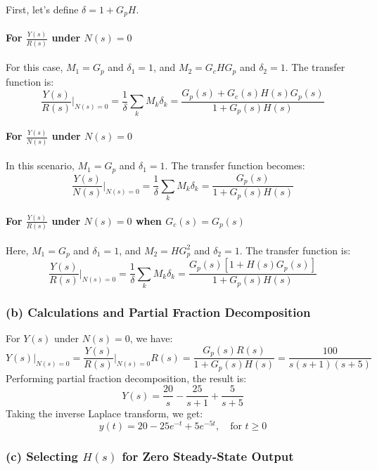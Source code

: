 \documentclass{article}
\begin{document}
First, let's define \( \delta = 1 + G_p H \).

\paragraph{For \( \frac{Y(s)}{R(s)} \) under \( N(s) = 0 \)}
For this case, \( M_1 = G_p \) and \( \delta_1 = 1 \), and \( M_2 = G_c H G_p \) and \( \delta_2 = 1 \).
The transfer function is:
\[
\frac{Y(s)}{R(s)} \bigg|_{N(s) = 0} = \frac{1}{\delta} \sum_k M_k \delta_k = \frac{G_p(s) + G_c(s) H(s) G_p(s)}{1 + G_p(s) H(s)}
\]

\paragraph{For \( \frac{Y(s)}{N(s)} \) under \( N(s) = 0 \)}
In this scenario, \( M_1 = G_p \) and \( \delta_1 = 1 \).
The transfer function becomes:
\[
\frac{Y(s)}{N(s)} \bigg|_{N(s) = 0} = \frac{1}{\delta} \sum_k M_k \delta_k = \frac{G_p(s)}{1 + G_p(s) H(s)}
\]

\paragraph{For \( \frac{Y(s)}{R(s)} \) under \( N(s) = 0 \) when \( G_c(s) = G_p(s) \)}
Here, \( M_1 = G_p \) and \( \delta_1 = 1 \), and \( M_2 = H G_p^2 \) and \( \delta_2 = 1 \).
The transfer function is:
\[
\frac{Y(s)}{R(s)} \bigg|_{N(s) = 0} = \frac{1}{\delta} \sum_k M_k \delta_k = \frac{G_p(s)[1 + H(s) G_p(s)]}{1 + G_p(s) H(s)}
\]

\subsubsection*{(b) Calculations and Partial Fraction Decomposition}

For \( Y(s) \) under \( N(s) = 0 \), we have:
\[
Y(s) \bigg|_{N(s) = 0} = \frac{Y(s)}{R(s)} \bigg|_{N(s) = 0} R(s) = \frac{G_p(s) R(s)}{1 + G_p(s) H(s)} = \frac{100}{s(s+1)(s+5)}
\]
Performing partial fraction decomposition, the result is:
\[
Y(s) = \frac{20}{s} - \frac{25}{s+1} + \frac{5}{s+5}
\]
Taking the inverse Laplace transform, we get:
\[
y(t) = 20 - 25e^{-t} + 5e^{-5t}, \quad \text{for } t \geq 0
\]

\subsubsection*{(c) Selecting \( H(s) \) for Zero Steady-State Output}
\end{document}
